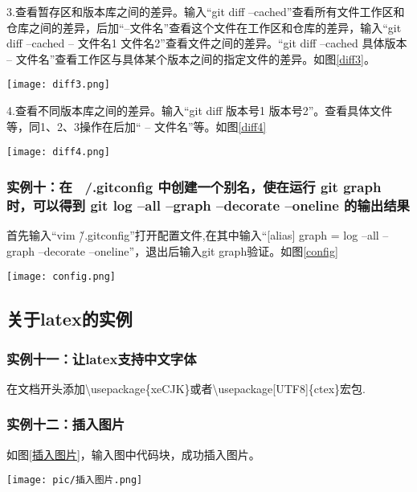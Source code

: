 \documentclass[a4paper]{article}
\begin{document}
3.查看暂存区和版本库之间的差异。输入“git diff --cached”查看所有文件工作区和仓库之间的差异，后加“--文件名”查看这个文件在工作区和仓库的差异，输入“git diff --cached -- 文件名1 文件名2”查看文件之间的差异。“git diff --cached 具体版本 -- 文件名”查看工作区与具体某个版本之间的指定文件的差异。如图\ref{diff3}。
\begin{figure*}[!htb]
    \centering
    \texttt{[image: diff3.png]}
    \caption{git diff3}
    \label{diff3}
\end{figure*}

 4.查看不同版本库之间的差异。输入“git diff 版本号1 版本号2”。查看具体文件等，同1、2、3操作在后加“ -- 文件名”等。如图\ref{diff4}
\begin{figure*}[!htb]
    \centering
    \texttt{[image: diff4.png]}
    \caption{diff4}
    \label{diff4}
\end{figure*}

\subsubsection{实例十：在 ~/.gitconfig 中创建一个别名，使在运行 git graph 时，可以得到 git log --all --graph --decorate --oneline 的输出结果}

首先输入“vim \~/.gitconfig”打开配置文件,在其中输入“[alias]  
    graph = log --all --graph --decorate --oneline”，退出后输入git graph验证。如图\ref{config}
\begin{figure*}[!htb]
    \centering
    \texttt{[image: config.png]}
    \caption{gitconfig}
    \label{config}
\end{figure*}
\subsection{关于latex的实例}
\subsubsection{实例十一：让latex支持中文字体}

在文档开头添加\textbackslash{}usepackage\{xeCJK\}或者\textbackslash{}usepackage[UTF8]\{ctex\}宏包.

\subsubsection{实例十二：插入图片}
如图\ref{插入图片}，输入图中代码块，成功插入图片。

\begin{figure*}[!htb]
    \centering
    \texttt{[image: pic/插入图片.png]}
    \caption{latex插入图片}
    \label{插入图片}
\end{figure*}
\end{document}
